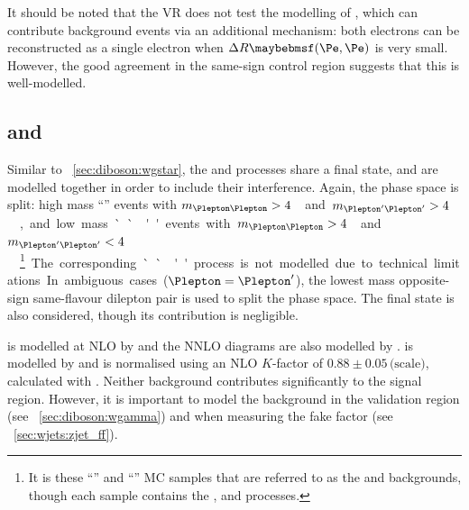 It should be noted that the \Wgstar VR does not test the modelling of 
\HepProcess{\Wgstar \HepTo \Plepton\Pnu\Pe\Pe}, which can contribute background events via 
an additional mechanism: both electrons can be reconstructed as a single electron when 
$\Delta R\parenths{\Pe,\Pe}$ is very small. However, the good agreement in the same-sign 
control region suggests that this is well-modelled.



\subsection{\ZZ and \Zgstar}
\label{sec:diboson:zz}

Similar to \Section~\ref{sec:diboson:wgstar}, the \ZZ and \Zgstar processes share a 
 final state, and are modelled together in 
order to include their interference. Again, the phase space is split: high mass 
``\ZZ'' events with \unit{$m_{\HepProcess{\Plepton\Plepton}} > 4$}{\GeV} and 
\unit{$m_{\HepProcess{\Plepton'\Plepton'}} > 4$}{\GeV}, and low mass ``\Zgstar'' events 
with \unit{$m_{\HepProcess{\Plepton\Plepton}} > 4$}{\GeV} and 
\unit{$m_{\HepProcess{\Plepton'\Plepton'}} < 4$}{\GeV}.\footnote{
	It is these ``\ZZ'' and ``\Zgstar''	MC samples that are referred to as the \ZZ and 
	\Zgstar backgrounds, though each sample contains the \ZZ, \Zgstar and 
	\HepProcess{\Pgammastar\Pgammastar} processes.
}
The corresponding ``\HepProcess{\Pgammastar\Pgammastar}'' process is not modelled due to 
technical limitations. In ambiguous cases ($\Plepton = \Plepton'$), the lowest mass 
opposite-sign same-flavour dilepton pair is used to split the phase space. The 
 final state is also considered, though its 
contribution is negligible. 

\ZZ is modelled at NLO by  and the NNLO \ggZZ diagrams are also 
modelled by \meps{\ggtozz}{\fherwig}. \Zgstar is modelled by \sherpa and is normalised using 
an NLO $K$-factor of $0.88\pm0.05\,\text{(scale)}$, calculated with \mcfm. Neither 
background contributes significantly to the signal region. However, it is important to model 
the \Zgstar background in the \Zgamma validation region (see 
\Section~\ref{sec:diboson:wgamma}) and when measuring the \Zjets fake factor (see 
\Section~\ref{sec:wjets:zjet_ff}).


